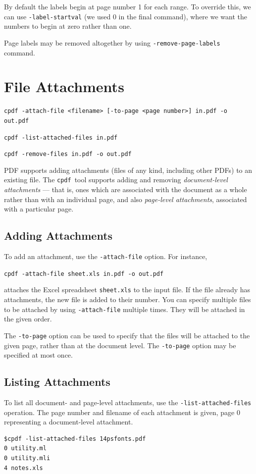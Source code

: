 \documentclass[a4paper,makeidx]{memoir}
\newcommand{\cpdf}{\texttt{cpdf}}
\begin{document}
\noindent By default the labels begin at page number 1 for each range. To override this, we can use \texttt{-label-startval} (we used $0$ in the final command), where we want the numbers to begin at zero rather than one.

Page labels may be removed altogether by using \texttt{-remove-page-labels} command.

\chapter{File Attachments}
\begin{framed}
  \small\noindent\verb!cpdf -attach-file <filename> [-to-page <page number>] in.pdf -o out.pdf!

  \vspace{1.5mm}
  \small\noindent\verb!cpdf -list-attached-files in.pdf!
 
  \vspace{1.5mm}
  \small\noindent\verb!cpdf -remove-files in.pdf -o out.pdf!
\end{framed}
  PDF supports adding attachments (files of any kind, including other PDFs) to
an existing file. The \cpdf\ tool supports adding and removing \textit{document-level
attachments} --- that is, ones which are associated with the document as a
whole rather than with an individual page, and also \textit{page-level attachments}, associated with a particular page.
  \section{Adding Attachments}
  To add an attachment, use the \texttt{-attach-file} option. For instance,
  \begin{framed}
  \small\verb!cpdf -attach-file sheet.xls in.pdf -o out.pdf!
  \end{framed}
  \noindent attaches the Excel spreadsheet \texttt{sheet.xls} to the input file. If the file already has attachments, the new file is added to their number. You can specify multiple files to be attached by using \verb!-attach-file! multiple times. They will be attached in the given order.
  
  The \texttt{-to-page} option can be used to specify that the files will be attached to the given page, rather than at the document level. The \texttt{-to-page} option may be specified at most once. 

\section{Listing Attachments}
To list all document- and page-level attachments, use the \texttt{-list-attached-files} operation. The page number and filename of each attachment is given, page 0 representing a document-level attachment.
\begin{framed}
\begin{verbatim}
$cpdf -list-attached-files 14psfonts.pdf
0 utility.ml
0 utility.mli
4 notes.xls
\end{verbatim}
\end{framed}
\end{document}
